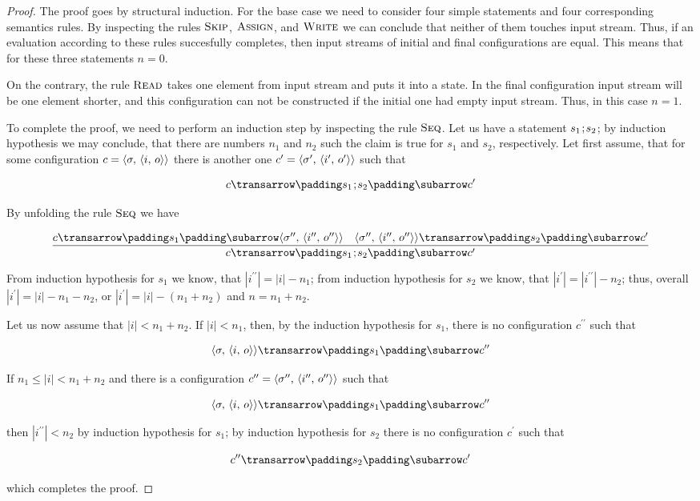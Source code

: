 \begin{proof}   
The proof goes by structural induction. For the base case we need to consider four simple statements and four corresponding semantics rules.
By inspecting the rules $\textsc{Skip}$, $\textsc{Assign}$, and $\textsc{Write}$ we can conclude that neither of them touches input stream. Thus,
if an evaluation according to these rules succesfully completes, then input streams of initial and final configurations are equal. This means that for these
three statements $n=0$.

On the contrary, the rule $\textsc{Read}$ takes one element from input stream and puts it into a state. In the final configuration input stream will be one
element shorter, and this configuration can not be constructed if the initial one had empty input stream. Thus, in this case $n=1$.

To complete the proof, we need to perform an induction step by inspecting the rule $\textsc{Seq}$. Let us have a statement $s_1\llang{;}s_2$; by
induction hypothesis we may conclude, that there are numbers $n_1$ and $n_2$ such the claim is true for $s_1$ and $s_2$, respectively. Let first
assume, that for some configuration $c=\left<{\sigma,\,\left<{i,\,o}\right>}\right>$ there is another one $c^\prime=\left<{\sigma^\prime,\,\left<{i^\prime,\,o^\prime}\right>}\right>$ such that

\[
\trans{c}{s_1\llang{;}s_2}{c^\prime}
\]

By unfolding the rule $\textsc{Seq}$ we have


\[
\trule{\trans{c}{s_1}{\inbr{\sigma^{\prime\prime},\,\inbr{i^{\prime\prime},\,o^{\prime\prime}}}}\quad\trans{\inbr{\sigma^{\prime\prime},\,\inbr{i^{\prime\prime},\,o^{\prime\prime}}}}{s_2}{c^\prime}}
      {\trans{c}{s_1\llang{;}s_2}{c^\prime}}
\]

From induction hypothesis for $s_1$ we know, that $|i^{\prime\prime}|=|i|-n_1$; from induction hypothesis for $s_2$ we know, that $|i^\prime|=|i^{\prime\prime}|-n_2$; thus, overall
$|i^\prime|=|i|-n_1-n_2$, or $|i^\prime|=|i|-(n_1+n_2)$ and $n=n_1+n_2$.

Let us now assume that $|i|<n_1+n_2$. If $|i|<n_1$, then, by the induction hypothesis for $s_1$, there is no configuration $c^{\prime\prime}$ such that

\[
\trans{\inbr{\sigma,\,\inbr{i,\,o}}}{s_1}{c^{\prime\prime}}
\]

If $n_1\le|i|<n_1+n_2$ and there is a configuration $c^{\prime\prime}=\left<{\sigma^{\prime\prime},\,\left<{i^{\prime\prime},\,o^{\prime\prime}}\right>}\right>$ such that

\[
\trans{\inbr{\sigma,\,\inbr{i,\,o}}}{s_1}{c^{\prime\prime}}
\]

then $|i^{\prime\prime}|<n_2$ by induction hypothesis for $s_1$; by induction hypothesis for $s_2$ there is no configuration $c^\prime$ such that

\[
\trans{c^{\prime\prime}}{s_2}{c^\prime}
\]

which completes the proof.
\end{proof}

